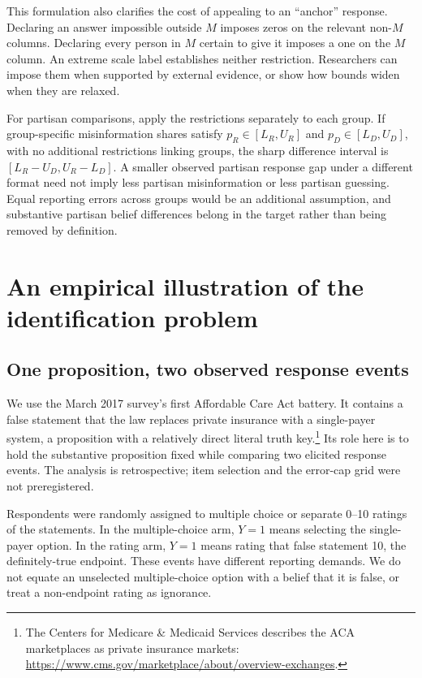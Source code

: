 \documentclass[11pt]{article}
\begin{document}
This formulation also clarifies the cost of appealing to an ``anchor'' response. Declaring an answer impossible outside $M$ imposes zeros on the relevant non-$M$ columns. Declaring every person in $M$ certain to give it imposes a one on the $M$ column. An extreme scale label establishes neither restriction. Researchers can impose them when supported by external evidence, or show how bounds widen when they are relaxed.

For partisan comparisons, apply the restrictions separately to each group. If group-specific misinformation shares satisfy $p_R\in[L_R,U_R]$ and $p_D\in[L_D,U_D]$, with no additional restrictions linking groups, the sharp difference interval is $[L_R-U_D,U_R-L_D]$. A smaller observed partisan response gap under a different format need not imply less partisan misinformation or less partisan guessing. Equal reporting errors across groups would be an additional assumption, and substantive partisan belief differences belong in the target rather than being removed by definition.

\section{An empirical illustration of the identification problem}

\subsection{One proposition, two observed response events}

We use the March 2017 survey's first Affordable Care Act battery. It contains a false statement that the law replaces private insurance with a single-payer system, a proposition with a relatively direct literal truth key.\footnote{The Centers for Medicare \& Medicaid Services describes the ACA marketplaces as private insurance markets: \url{https://www.cms.gov/marketplace/about/overview-exchanges}.} Its role here is to hold the substantive proposition fixed while comparing two elicited response events. The analysis is retrospective; item selection and the error-cap grid were not preregistered.

Respondents were randomly assigned to multiple choice or separate 0--10 ratings of the statements. In the multiple-choice arm, $Y=1$ means selecting the single-payer option. In the rating arm, $Y=1$ means rating that false statement 10, the definitely-true endpoint. These events have different reporting demands. We do not equate an unselected multiple-choice option with a belief that it is false, or treat a non-endpoint rating as ignorance.
\end{document}
